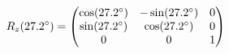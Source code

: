 \documentclass[preview]{standalone}
\begin{document}
\begin{align*}
\special{dvisvgm:raw <g id='unique000'>}R_z(27.2^\circ) = \begin{pmatrix} \cos(27.2^\circ) & -\sin(27.2^\circ) & 0 \\ \sin(27.2^\circ) & \cos(27.2^\circ) & 0 \\ 0 & 0 & 1 \end{pmatrix}\special{dvisvgm:raw </g>}
\end{align*}
\end{document}
